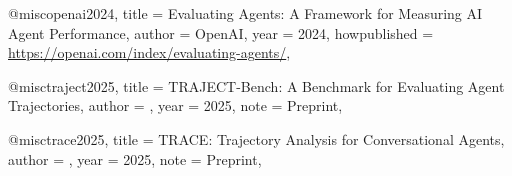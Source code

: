 
\newcommand{\dentalclaw}{Dental\-Claw}



@misc{openai2024,
  title  = {Evaluating Agents: A Framework for Measuring AI Agent Performance},
  author = {{OpenAI}},
  year   = {2024},
  howpublished = {\url{https://openai.com/index/evaluating-agents/}},
}

@misc{traject2025,
  title  = {{TRAJECT-Bench}: A Benchmark for Evaluating Agent Trajectories},
  author = {},
  year   = {2025},
  note   = {Preprint},
}

@misc{trace2025,
  title  = {{TRACE}: Trajectory Analysis for Conversational Agents},
  author = {},
  year   = {2025},
  note   = {Preprint},
}

%
%

